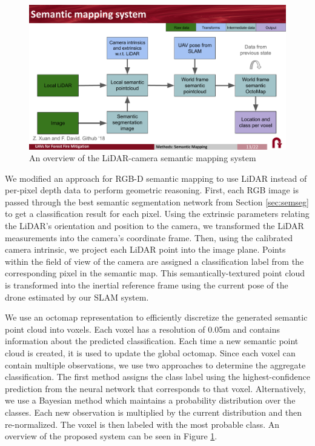 \begin{figure}[!ht]
    \centering
    \includegraphics[width=\textwidth, clip, trim={0 1.5cm 0 1.8cm}]{figs/methods/semantic_mapping/semantic_mapping_overview.pdf}
    \caption{An overview of the LiDAR-camera semantic mapping system}
    \label{fig:methods:lidar-camera-semantic-mapping}
\end{figure}

We modified an approach for RGB-D semantic mapping \cite{semantic_slam} to use LiDAR instead of per-pixel depth data to perform geometric reasoning. First, each RGB image is passed through the best semantic segmentation network from Section \ref{sec:semseg} to get a classification result for each pixel. Using the extrinsic parameters relating the LiDAR's orientation and position to the camera, we transformed the LiDAR measurements into the camera's coordinate frame. Then, using the calibrated camera intrinsic, we project each LiDAR point into the image plane. Points within the field of view of the camera are assigned a classification label from the corresponding pixel in the semantic map. This semantically-textured point cloud is transformed into the inertial reference frame using the current pose of the drone estimated by our SLAM system. 

We use an octomap \cite{hornung13auro} representation to efficiently discretize the generated semantic point cloud into voxels. Each voxel has a resolution of 0.05m and contains information about the predicted classification. Each time a new semantic point cloud is created, it is used to update the global octomap. Since each voxel can contain multiple observations, we use two approaches to determine the aggregate classification. The first method assigns the class label using the highest-confidence prediction from the neural network that corresponds to that voxel. Alternatively, we use a Bayesian method which maintains a probability distribution over the classes. Each new observation is multiplied by the current distribution and then re-normalized. The voxel is then labeled with the most probable class. An overview of the proposed system can be seen in Figure \ref{fig:methods:lidar-camera-semantic-mapping}.


